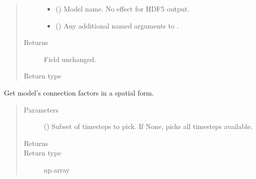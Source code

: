 \documentclass[letterpaper,10pt,english]{sphinxmanual}
\begin{document}
\begin{fulllineitems}
\begin{fulllineitems}
\begin{quote}
\begin{description}
\begin{itemize}
\item {} 
 () \textendash{} Model name. No effect for HDF5 output.

\item {} 
 () \textendash{} Any additional named arguments to .

\end{itemize}

\item[{Returns}] \leavevmode
{} \textendash{} Field unchanged.

\item[{Return type}] \leavevmode
{\hyperref[\detokenize{api/field:geology.src.Field}]{}}

\end{description}\end{quote}

\end{fulllineitems}


\begin{fulllineitems}
\label{\detokenize{api/field:geology.src.Field.get_spatial_connection_factors}}
Get model’s connection factors in a spatial form.
\begin{quote}\begin{description}
\item[{Parameters}] \leavevmode
{} () \textendash{} Subset of timesteps to pick. If None, picks all timesteps available.

\item[{Returns}] \leavevmode
{}

\item[{Return type}] \leavevmode
np.array


\end{description}
\end{quote}
\end{fulllineitems}
\end{fulllineitems}
\end{document}
